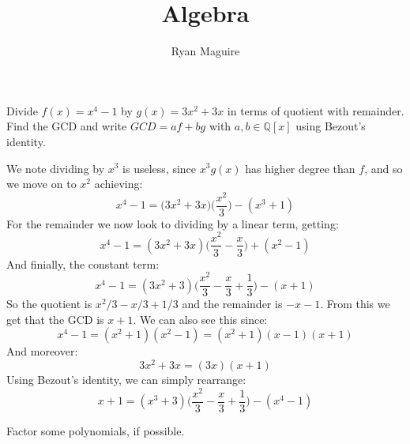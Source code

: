 \documentclass{article}                                                        %
\begin{document}
    \title{Algebra}
    \author{Ryan Maguire}
    \date{\vspace{-5ex}}
    \maketitle
    \setcounter{section}{1}
    \begin{problem}
        Divide $f(x)=x^{4}-1$ by $g(x)=3x^{2}+3x$ in terms of quotient with
        remainder. Find the GCD and write $GCD=af+bg$ with $a,b\in\mathbb{Q}[x]$
        using Bezout's identity.
    \end{problem}
    \begin{solution}
        We note dividing by $x^{3}$ is useless, since $x^{3}g(x)$ has higher
        degree than $f$, and so we move on to $x^{2}$ achieving:
        \begin{equation}
            x^{4}-1=\big(3x^{2}+3x\big)\Big(\frac{x^{2}}{3}\Big)
                -(x^{3}+1)
        \end{equation}
        For the remainder we now look to dividing by a linear term, getting:
        \begin{equation}
            x^{4}-1=(3x^{2}+3x)\Big(\frac{x^{2}}{3}-\frac{x}{3}\Big)+(x^{2}-1)
        \end{equation}
        And finially, the constant term:
        \begin{equation}
            x^{4}-1=(3x^{2}+3)\Big(\frac{x^{2}}{3}-\frac{x}{3}+\frac{1}{3}\Big)
                -(x+1)
        \end{equation}
        So the quotient is $x^{2}/3-x/3+1/3$ and the remainder is $\minus{x}-1$.
        From this we get that the GCD is $x+1$. We can also see this since:
        \begin{equation}
            x^{4}-1=(x^{2}+1)(x^{2}-1)=(x^{2}+1)(x-1)(x+1)
        \end{equation}
        And moreover:
        \begin{equation}
            3x^{2}+3x=(3x)(x+1)
        \end{equation}
        Using Bezout's identity, we can simply rearrange:
        \begin{equation}
            x+1=(x^{3}+3)\Big(\frac{x^{2}}{3}-\frac{x}{3}+\frac{1}{3}\Big)
                -(x^{4}-1)
        \end{equation}
    \end{solution}
    \begin{problem}
        Factor some polynomials, if possible.
    \end{problem}
\end{document}
